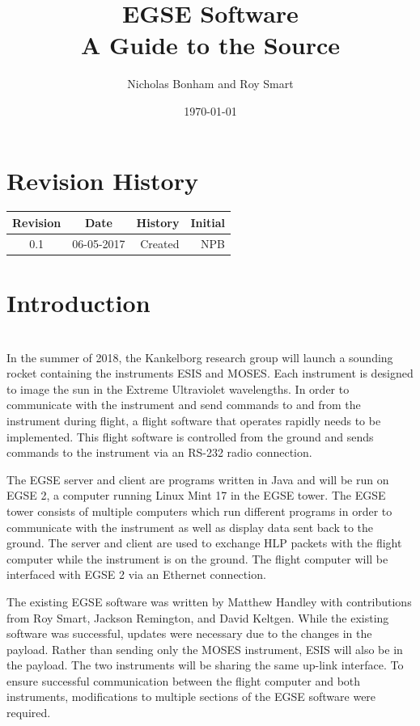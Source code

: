 \documentclass[11pt,titlepage]{article}
\author{Nicholas Bonham and Roy Smart}
\title{EGSE Software \\ A Guide to the Source}
\date{\today}
\begin{document}
	
\maketitle
\tableofcontents
\newpage
	
\section[Revisions]{Revision History}
	\begin{longtable}{|c|c|r|r|}
		\hline
		Revision	&	Date	&	\multicolumn{1}{c|}{History}	&	\multicolumn{1}{c|}{Initial}\\
		\hline
		0.1		&	06-05-2017	&	Created	&	NPB\\
		\hline
	\end{longtable}
	
\newpage

\section{Introduction}
\hrulefill
\\
	In the summer of 2018, the Kankelborg research group will launch a sounding rocket containing the instruments ESIS and MOSES. Each instrument is designed to image the sun in the Extreme Ultraviolet wavelengths. In order to communicate with the instrument and send commands to and from the instrument during flight, a flight software that operates rapidly needs to be implemented. This flight software is controlled from the ground and sends commands to the instrument via an RS-232 radio connection. \par
	The EGSE server and client are programs written in Java and will be run on EGSE 2, a computer running Linux Mint 17 in the EGSE tower. The EGSE tower consists of multiple computers which run different programs in order to communicate with the instrument as well as display data sent back to the ground. The server and client are used to exchange HLP packets with the flight computer while the instrument is on the ground. The flight computer will be interfaced with EGSE 2 via an Ethernet connection. \par
	The existing EGSE software was written by Matthew Handley with contributions from Roy Smart, Jackson Remington, and David Keltgen. While the existing software was successful, updates were necessary due to the changes in the payload. Rather than sending only the MOSES instrument, ESIS will also be in the payload. The two instruments will be sharing the same up-link interface. To ensure successful communication between the flight computer and both instruments, modifications to multiple sections of the EGSE software were required. \par
\end{document}
